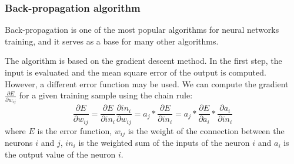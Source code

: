\subsubsection{Back-propagation algorithm}
Back-propagation is one of the most popular algorithms for neural networks training, and it serves as a base for many other algorithms.

The algorithm is based on the gradient descent method. In the first step, the input is evaluated and the mean square error of the output is computed. However, a different error function may be used. We can compute the gradient $\frac{\partial E}{\partial w_{ij}}$ for a given training sample using the chain rule:
\begin{equation*}
\frac{\partial E}{\partial w_{ij}} = \frac{\partial E}{\partial in_{i}} \frac{\partial in_{i}}{\partial w_{ij}} = 
a_{j}*\frac{\partial E}{\partial in_{i}} = a_{j}*\frac{\partial E}{\partial a_{i}}*\frac{\partial a_{i}}{\partial in_{i}}
\end{equation*}
where $E$ is the error function, $w_{ij}$ is the weight of the connection between the neurons $i$ and $j$, $in_{i}$ is the weighted sum of the inputs of the neuron $i$ and $a_{i}$ is the output value of the neuron $i$.

